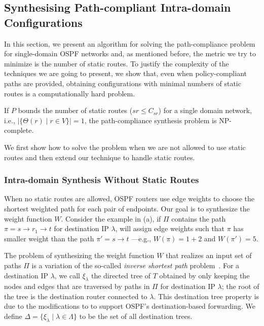 \subsection{Synthesising Path-compliant Intra-domain Configurations} \label{sec:intra-synthesis}
In this section, we present an algorithm for 
solving the path-compliance problem for 
single-domain OSPF networks and, as mentioned before, the metric we try to minimize is the number of static routes.
To justify the complexity of the techniques we are going to present,
we show that, even when policy-compliant paths are provided, 
obtaining configurations with minimal numbers of static routes is a 
computationally hard problem.
\begin{theorem}
\label{thm:ospfsynth}
If $P$ bounds the number of static routes ($sr\leq C_{sr}$) for a
single domain network, i.e., $|\{\Theta(r) \mid r\in V\}|=1$, the path-compliance synthesis
problem is NP-complete.
\end{theorem}
\iffull

\fi

We first show how to solve the problem when
we are not allowed to use static routes
and then
extend our technique to handle static routes.
			
\subsubsection{Intra-domain Synthesis Without Static Routes} \label{sec:ospf}
 
When no static routes are allowed,
 OSPF routers use edge weights
 to choose the
 shortest weighted path for each pair of endpoints. 
Our goal is to synthesize the weight function $W$.
Consider the example in (a), if $\Pi$ 
 contains the 
 path $\pi=s\rightarrow r_1 \rightarrow t$ for
 destination IP $\lambda$, \name will assign
 edge weights such that $\pi$ has
 smaller weight than the path $\pi'=s \rightarrow t$ ---e.g., $W(\pi)=1+2$
  and $W(\pi')=5$. 
 
The problem of synthesizing the weight function $W$ that
realizes an input set of paths $\Pi$ is
a
variation of the so-called {\em inverse shortest path} 
problem~\cite{isp}. 
For a destination IP $\lambda$, we call $\xi_\lambda$ 
the directed tree of $T$ 
obtained by only keeping the nodes and edges 
that are traversed by paths in $\Pi$ for 
destination IP $\lambda$; the root of the tree
is the destination router connected to $\lambda$. 
 This destination tree
 property is due to the modifications to \genesis
 to support OSPF's destination-based forwarding. We
 define $\Delta=\{\xi_\lambda\mid \lambda \in \Lambda\}$ to be 
the set of all destination trees. 

